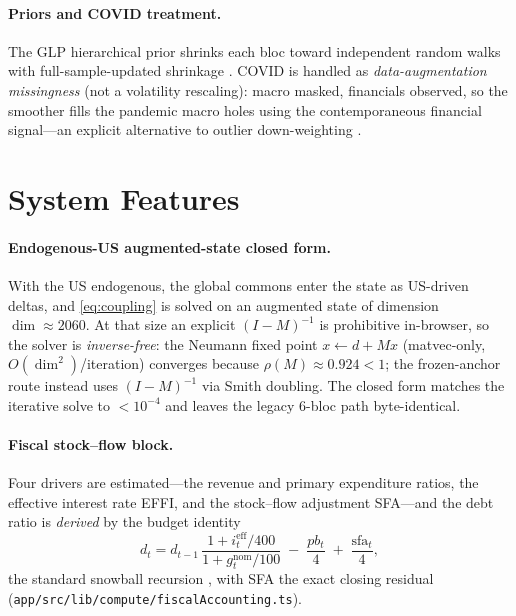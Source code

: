 \documentclass[11pt]{article}
\begin{document}
\paragraph{Priors and COVID treatment.} The GLP hierarchical prior shrinks each bloc toward
independent random walks with full-sample-updated shrinkage \citep{GiannoneLenzaPrimiceri2019,Giannone2015}.
COVID is handled as \emph{data-augmentation missingness} (not a volatility rescaling): macro masked,
financials observed, so the smoother fills the pandemic macro holes using the contemporaneous financial
signal---an explicit alternative to outlier down-weighting \citep{LenzaPrimiceri2022,CarrieroClarkMarcellino2015}.

\section{System Features}

\paragraph{Endogenous-US augmented-state closed form.} With the US endogenous, the global commons enter
the state as US-driven deltas, and \eqref{eq:coupling} is solved on an augmented state of dimension
$\dim\approx 2060$. At that size an explicit $(I-M)^{-1}$ is prohibitive in-browser, so the solver is
\emph{inverse-free}: the Neumann fixed point $x \leftarrow d + Mx$ (matvec-only, $O(\dim^2)$/iteration)
converges because $\rho(M)\approx 0.924 < 1$; the frozen-anchor route instead uses
$(I-M)^{-1}$ via Smith doubling. The closed form matches the iterative solve to $<10^{-4}$ and leaves the
legacy 6-bloc path byte-identical.

\paragraph{Fiscal stock--flow block.} Four drivers are estimated---the revenue and primary
expenditure ratios, the effective interest rate EFFI, and the stock--flow adjustment SFA---and
the debt ratio is \emph{derived} by the budget identity
\begin{equation}
  d_t = d_{t-1}\,\frac{1 + i^{\text{eff}}_t/400}{1 + g^{\text{nom}}_t/100} \;-\; \frac{pb_t}{4} \;+\; \frac{\text{sfa}_t}{4},
  \label{eq:debt}
\end{equation}
the standard snowball recursion \citep{Bohn1998,Escolano2010,IMF2013DSA}, with SFA the exact closing
residual (\texttt{app/src/lib/compute/fiscalAccounting.ts}).
\end{document}

